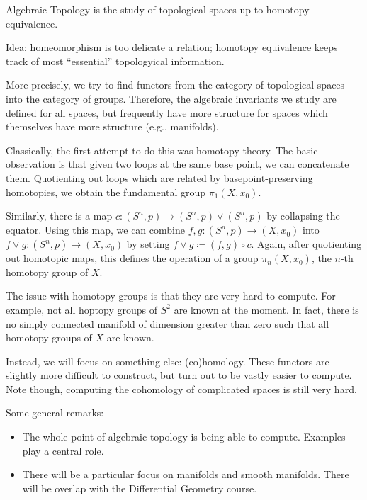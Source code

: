 Algebraic Topology is the study of topological spaces up to homotopy equivalence.

Idea: homeomorphism is too delicate a relation; homotopy equivalence keeps track of
most \enquote{essential} topologyical information.

More precisely, we try to find functors from the category of topological spaces
into the category of groups. Therefore, the algebraic invariants we study are defined
for all spaces, but frequently have more structure for spaces which themselves have
more structure (e.g., manifolds).

Classically, the first attempt to do this was homotopy theory. The basic observation
is that given two loops at the same base point, we can concatenate them.
Quotienting out loops which are related by basepoint-preserving homotopies, we obtain
the fundamental group $\pi_1(X, x_0)$.

Similarly, there is a map $c\colon (S^n, p) \to (S^n, p) \vee (S^n, p)$ by collapsing the
equator. Using this map, we can combine $f, g\colon (S^n, p)\to (X, x_0)$ into
$f\vee g\colon (S^n, p) \to (X, x_0)$ by setting $f\vee g\coloneqq (f, g)\circ c$.
Again, after quotienting out homotopic maps, this defines the operation of a group
$\pi_n(X, x_0)$, the $n$-th homotopy group of $X$.

The issue with homotopy groups is that they are very hard to compute. For example,
not all hoptopy groups of $S^2$ are known at the moment. In fact,
there is no simply connected manifold of dimension greater than zero such that
all homotopy groups of $X$ are known.

Instead, we will focus on something else: (co)homology. These functors are
slightly more difficult to construct, but turn out to be vastly easier to
compute. Note though, computing the cohomology of complicated spaces is still
very hard.

Some general remarks:
\begin{itemize}
	\item The whole point of algebraic topology is being able to compute. Examples
		play a central role.
	\item There will be a particular focus on manifolds and smooth manifolds.
		There will be overlap with the Differential Geometry course.
\end{itemize}
